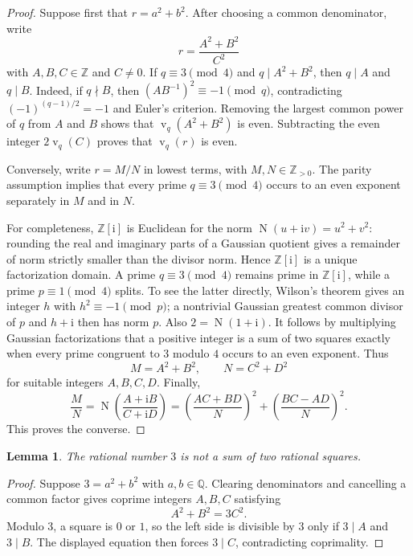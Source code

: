 \documentclass[11pt,a4paper]{article}
\numberwithin{equation}{section}
\newtheorem{lemma}[theorem]{Lemma}
\theoremstyle{definition}
\newcommand{\Q}{\mathbb Q}
\newcommand{\Z}{\mathbb Z}
\newcommand{\ii}{\mathrm i}
\newcommand{\N}{\operatorname N}
\newcommand{\vord}{\operatorname v}
\begin{document}
\begin{proof}
Suppose first that $r=a^2+b^2$.  After choosing a common denominator, write
\[
 r=\frac{A^2+B^2}{C^2}
\]
with $A,B,C\in\Z$ and $C\ne0$.  If $q\equiv3\pmod4$ and
$q\mid A^2+B^2$, then $q\mid A$ and $q\mid B$.  Indeed, if $q\nmid B$,
then $(AB^{-1})^2\equiv-1\pmod q$, contradicting
$(-1)^{(q-1)/2}=-1$ and Euler's criterion.  Removing the largest common
power of $q$ from $A$ and $B$ shows that $\vord_q(A^2+B^2)$ is even.
Subtracting the even integer $2\vord_q(C)$ proves that $\vord_q(r)$ is even.

Conversely, write $r=M/N$ in lowest terms, with $M,N\in\Z_{>0}$.  The parity
assumption implies that every prime $q\equiv3\pmod4$ occurs to an even
exponent separately in $M$ and in $N$.

For completeness, $\Z[\ii]$ is Euclidean for the norm
$\N(u+\ii v)=u^2+v^2$: rounding the real and imaginary parts of a Gaussian
quotient gives a remainder of norm strictly smaller than the divisor norm.
Hence $\Z[\ii]$ is a unique factorization domain.  A prime
$q\equiv3\pmod4$ remains prime in $\Z[\ii]$, while a prime
$p\equiv1\pmod4$ splits.  To see the latter directly, Wilson's theorem gives
an integer $h$ with $h^2\equiv-1\pmod p$; a nontrivial Gaussian greatest
common divisor of $p$ and $h+\ii$ then has norm $p$.  Also
$2=\N(1+\ii)$.  It follows by multiplying Gaussian factorizations that a
positive integer is a sum of two squares exactly when every prime
congruent to $3$ modulo $4$ occurs to an even exponent.  Thus
\[
 M=A^2+B^2,
 \qquad
 N=C^2+D^2
\]
for suitable integers $A,B,C,D$.  Finally,
\[
 \frac{M}{N}
 =\N\!\left(\frac{A+\ii B}{C+\ii D}\right)
 =\left(\frac{AC+BD}{N}\right)^2
  +\left(\frac{BC-AD}{N}\right)^2.
\]
This proves the converse.
\end{proof}

\begin{lemma}
\label{lem:three-not-norm}
The rational number $3$ is not a sum of two rational squares.
\end{lemma}

\begin{proof}
Suppose $3=a^2+b^2$ with $a,b\in\Q$.  Clearing denominators and cancelling a
common factor gives coprime integers $A,B,C$ satisfying
\[
 A^2+B^2=3C^2.
\]
Modulo $3$, a square is $0$ or $1$, so the left side is divisible by $3$
only if $3\mid A$ and $3\mid B$.  The displayed equation then forces
$3\mid C$, contradicting coprimality.
\end{proof}
\end{document}
